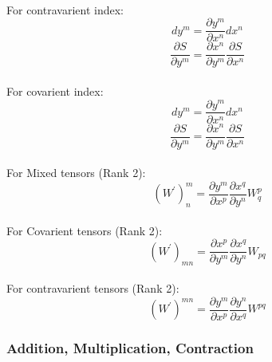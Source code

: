\paragraph{} For contravarient index:
\begin{equation}
  dy^m = \frac{\partial y^m}{\partial x^n} dx^n
\end{equation}
\begin{equation}
  \frac{\partial S}{\partial y^m} = \frac{\partial x^n}{\partial y^m} \frac{\partial S}{\partial x^n}
\end{equation}

\paragraph{} For covarient index:
\begin{equation}
  dy^m = \frac{\partial y^m}{\partial x^n} dx^n
\end{equation}
\begin{equation}
  \frac{\partial S}{\partial y^m} = \frac{\partial x^n}{\partial y^m} \frac{\partial S}{\partial x^n}
\end{equation}

\paragraph{} For Mixed tensors (Rank 2):
\begin{equation}
  (W^\prime)^m_n = \frac{\partial y^m}{\partial x^p} \frac{\partial x^q}{\partial y^n} W^p_q
\end{equation}
\paragraph{} For Covarient tensors (Rank 2):
\begin{equation}
  (W^\prime)_{mn} = \frac{\partial x^p}{\partial y^m} \frac{\partial x^q}{\partial y^n} W_{pq}
\end{equation}
\paragraph{} For contravarient tensors (Rank 2):
\begin{equation}
  (W^\prime)^{mn} = \frac{\partial y^m}{\partial x^p} \frac{\partial y^n}{\partial x^q} W^{pq}
\end{equation}

\subsubsection{Addition, Multiplication, Contraction}

